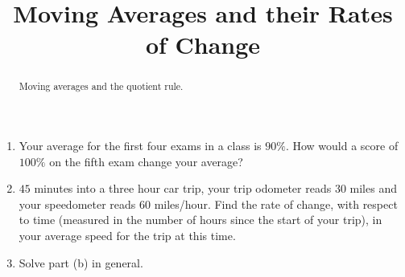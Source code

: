 \documentclass{ximera}
\title{Moving Averages and their Rates of Change}
\begin{document}
\begin{abstract}
Moving averages and the quotient rule.
\end{abstract}
\maketitle


\begin{question} \label{QPderRERglO}
\begin{enumerate}
\item Your average for the first four exams in a class is $90\%$. How would a score of $100\%$ on the fifth exam change your average?

\item $45$ minutes into a three hour car trip, your trip odometer reads $30$ miles and your speedometer reads $60$ miles/hour. Find the rate of change, with respect to time (measured in the number of hours since the start of your trip), in your average speed for the trip at this time.

\item Solve part (b) in general. 
\end{enumerate}
\end{question}
\end{document}
